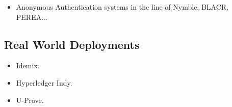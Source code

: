 \begin{itemize}
\item Anonymous Authentication systems in the line of Nymble, BLACR, PEREA...
\end{itemize}

\subsection{Real World Deployments}
\label{ssec:acrealworld}

\begin{itemize}
\item Idemix.
\item Hyperledger Indy.
\item U-Prove.
\end{itemize}

